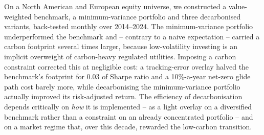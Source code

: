 \documentclass[11pt,a4paper]{article}
\begin{document}
On a North American and European equity universe, we constructed a
value-weighted benchmark, a minimum-variance portfolio and three decarbonised
variants, back-tested monthly over 2014--2024. The minimum-variance portfolio
underperformed the benchmark and -- contrary to a naive expectation -- carried a
carbon footprint several times larger, because low-volatility investing is an
implicit overweight of carbon-heavy regulated utilities. Imposing a carbon
constraint corrected this at negligible cost: a tracking-error overlay halved
the benchmark's footprint for 0.03 of Sharpe ratio and a 10\%-a-year
net-zero glide path cost barely more, while decarbonising the minimum-variance
portfolio actually improved its risk-adjusted return. The efficiency of
decarbonisation depends critically on \emph{how} it is implemented -- as a light
overlay on a diversified benchmark rather than a constraint on an already
concentrated portfolio -- and on a market regime that, over this decade,
rewarded the low-carbon transition.
\end{document}
